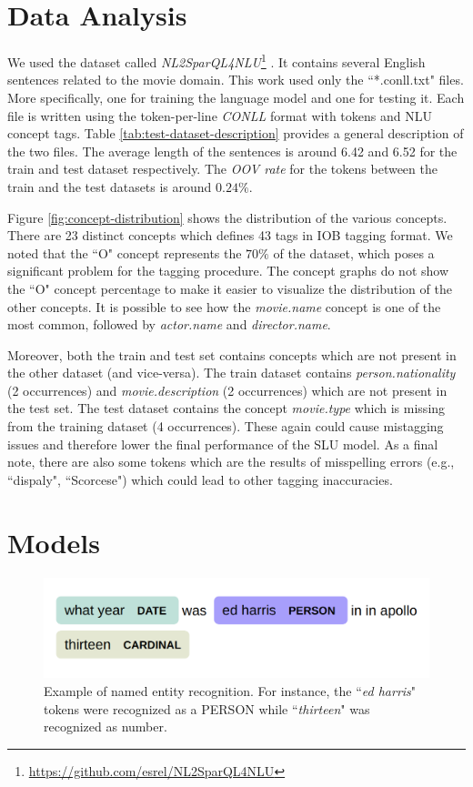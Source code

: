 \documentclass[11pt,a4paper]{article}
\begin{document}
\section{Data Analysis}

We used the dataset called \textit{NL2SparQL4NLU}\footnote{\url{https://github.com/esrel/NL2SparQL4NLU}} \citep{Chen2014DerivingLR, gobbi2018concept}. It contains several English sentences related to the movie domain. This work used only the ``*.conll.txt" files. More specifically, one for training the language model and one for testing it. Each file is written using the token-per-line \textit{CONLL} format with tokens and NLU concept tags. Table \ref{tab:test-dataset-description} provides a general description of the two files. The average length of the sentences is around 6.42 and 6.52 for the train and test dataset respectively. The \textit{OOV rate} for the tokens between the train and the test datasets is around $0.24\%$.


Figure \ref{fig:concept-distribution} shows the distribution of the various concepts. 
There are 23 distinct concepts which defines 43 tags in IOB tagging format. We noted that the ``O" concept represents the $70\%$ of the dataset, which poses a significant problem for the tagging procedure. The concept graphs do not show the ``O" concept percentage to make it easier to visualize the distribution of the other concepts. It is possible to see how the \textit{movie.name} concept is one of the most common, followed by \textit{actor.name} and \textit{director.name}.


Moreover, both the train and test set contains concepts which are not present in the other dataset (and vice-versa). The train dataset contains \textit{person.nationality} (2 occurrences) and \textit{movie.description} (2 occurrences) which are not present in the test set. The test dataset contains the concept \textit{movie.type} which is missing from the training dataset (4 occurrences). These again could cause mistagging issues and therefore lower the final performance of the SLU model. 
As a final note, there are also
some tokens which are the results of misspelling errors (e.g., ``dispaly", ``Scorcese") which could lead to other tagging inaccuracies.



\section{Models}

\begin{figure}[b!]
\centering
	\includegraphics[width=1\linewidth]{img/entity}
	\caption{Example of named entity recognition. For instance, the ``\textit{ed harris}" tokens were recognized as a PERSON while ``\textit{thirteen}" was recognized as number.}
	\label{fig:entity-recognition}
\end{figure}
\end{document}
